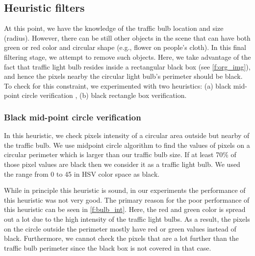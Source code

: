 \subsection{Heuristic filters}
\label{s:filter}
At this point, we have the knowledge of the traffic bulb location and size (radius).
However, there can be still other objects in the scene that can have both green or red color and circular shape (e.g., flower on people's cloth).
In this final filtering stage, we attempt to remove such objects. 
Here, we take advantage of the fact that traffic light bulb resides inside a rectangular black box (see \ref{f:org_img}), and hence the pixels nearby the circular light bulb's perimeter should be black.
To check for this constraint, we experimented with two heuristics: (a) black mid-point circle verification \cite{midpoint}, (b) black rectangle box verification.

\subsubsection{Black mid-point circle verification}
In this heuristic, we check pixels intensity of a circular area outside but nearby of the traffic bulb.
We use midpoint circle algorithm to find the values of pixels on a circular perimeter which is larger than our traffic bulb size.
If at least 70\% of those pixel values are black then we consider it as a traffic light bulb.
We used the range from 0 to 45 in HSV color space as black.

While in principle this heuristic is sound, in our experiments the performance of this heuristic was not very good. 
The primary reason for the poor performance of this heuristic can be seen in \ref{f:bulb_int}.
Here, the red and green color is spread out a lot due to the high intensity of the traffic light bulbs. 
As a result, the pixels on the circle outside the perimeter mostly have red or green values instead of black.
Furthermore, we cannot check the pixels that are a lot further than the traffic bulb perimeter since the black box is not covered in that case.


